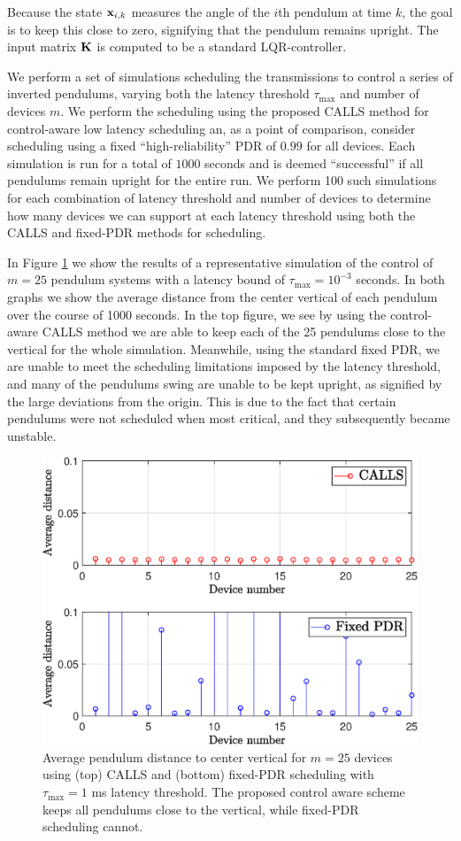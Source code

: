 Because the state ${\mathbf x}_{i,k}$ measures the angle of the $i$th pendulum at time $k$, the goal is to keep this close to zero, signifying that the pendulum remains upright. The input matrix ${\mathbf K}$ is computed to be a standard LQR-controller.

We perform a set of simulations scheduling the transmissions to control a series of inverted pendulums, varying both the latency threshold $\tau_{\max}$ and number of devices $m$. We perform the scheduling using the proposed CALLS method for control-aware low latency scheduling an, as a point of comparison, consider scheduling using a fixed ``high-reliability'' PDR of $0.99$ for all devices. Each simulation is run for a total of $1000$ seconds and is deemed ``successful'' if all pendulums remain upright for the entire run. We perform 100 such simulations for each combination of latency threshold and number of devices to determine how many devices we can support at each latency threshold using both the CALLS and fixed-PDR methods for scheduling.

In Figure \ref{fig_ip_dist} we show the results of a representative simulation of the control of $m=25$ pendulum systems with a latency bound of $\tau_{\max} = 10^{-3}$ seconds. In both graphs we show the average distance from the center vertical of each pendulum over the course of 1000 seconds. In the top figure, we see by using the control-aware CALLS method we are able to keep each of the 25 pendulums close to the vertical for the whole simulation. Meanwhile, using the standard fixed PDR, we are unable to meet the scheduling limitations imposed by the latency threshold, and many of the pendulums swing are unable to be kept upright, as signified by the large deviations from the origin. This is due to the fact that certain pendulums were not scheduled when most critical, and they subsequently became unstable.

\begin{figure}
\centering
\includegraphics[width=.45\textwidth]{../images/ip_dist.eps}
\caption{Average pendulum distance to center vertical for $m=25$ devices using (top) CALLS and (bottom) fixed-PDR scheduling with $\tau_{\max}= 1$ ms latency threshold. The proposed control aware scheme keeps all pendulums close to the vertical, while fixed-PDR scheduling cannot.}
\label{fig_ip_dist}
\end{figure}

